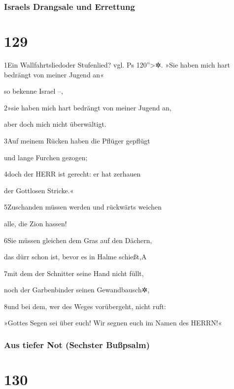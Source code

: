 \hypertarget{israels-drangsale-und-errettung}{%
\subsubsection{Israels Drangsale und
Errettung}\label{israels-drangsale-und-errettung}}

\hypertarget{section-128}{%
\section{129}\label{section-128}}

1Ein Wallfahrtsliedoder Stufenlied? vgl. Ps 120''\textgreater✲. »Sie
haben mich hart bedrängt von meiner Jugend an«

so bekenne Israel --,

2»sie haben mich hart bedrängt von meiner Jugend an,

aber doch mich nicht überwältigt.

3Auf meinem Rücken haben die Pflüger gepflügt

und lange Furchen gezogen;

4doch der HERR ist gerecht: er hat zerhauen

der Gottlosen Stricke.«

5Zuschanden müssen werden und rückwärts weichen

alle, die Zion hassen!

6Sie müssen gleichen dem Gras auf den Dächern,

das dürr schon ist, bevor es in Halme schießt,{A}

7mit dem der Schnitter seine Hand nicht füllt,

noch der Garbenbinder seinen Gewandbausch✲,

8und bei dem, wer des Weges vorübergeht, nicht ruft:

»Gottes Segen sei über euch! Wir segnen euch im Namen des HERRN!«

\hypertarget{aus-tiefer-not-sechster-buuxdfpsalm}{%
\subsubsection{Aus tiefer Not (Sechster
Bußpsalm)}\label{aus-tiefer-not-sechster-buuxdfpsalm}}

\hypertarget{section-129}{%
\section{130}\label{section-129}}

